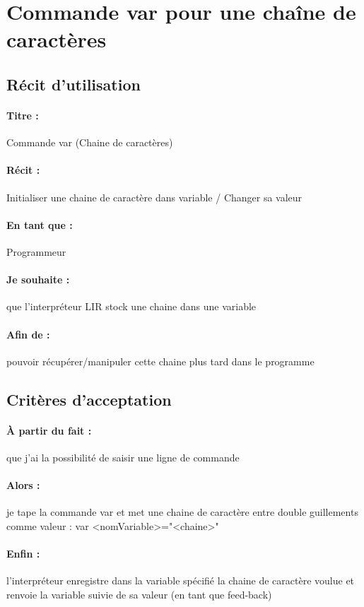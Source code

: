     \section{Commande var pour une chaîne de caractères}

    \subsection*{Récit d'utilisation}

    \paragraph{Titre : } Commande var (Chaine de caractères)
    \paragraph{Récit : }  Initialiser une chaine de caractère dans variable / Changer sa valeur
    \paragraph{En tant que : } Programmeur
    \paragraph{Je souhaite : } que l'interpréteur LIR stock une chaine dans une variable
    \paragraph{Afin de : } pouvoir récupérer/manipuler cette chaine plus tard dans le programme


    \subsection*{Critères d'acceptation}

    \paragraph{À partir du fait : } que j'ai la possibilité de saisir une ligne de commande
    \paragraph{Alors : } je tape la commande var et met une chaine de caractère entre double guillements comme valeur : var <nomVariable>="<chaine>"
    \paragraph{Enfin : } l'interpréteur enregistre dans la variable spécifié la chaine de caractère voulue et renvoie la variable suivie de sa valeur (en tant que feed-back)